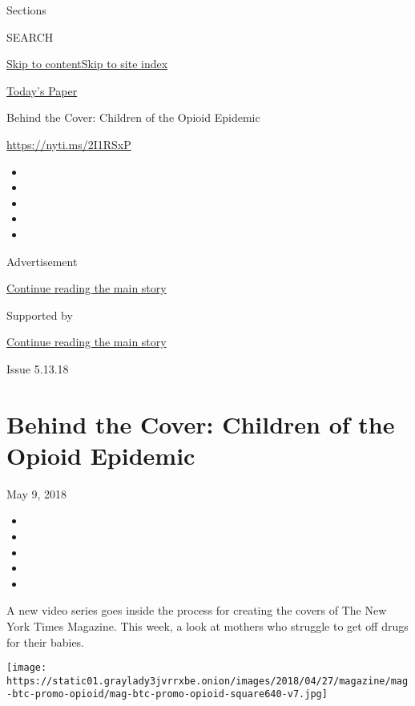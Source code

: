Sections

SEARCH

\protect\hyperlink{site-content}{Skip to
content}\protect\hyperlink{site-index}{Skip to site index}

\href{https://myaccount.nytimes3xbfgragh.onion/auth/login?response_type=cookie\&client_id=vi}{}

\href{https://www.nytimes3xbfgragh.onion/section/todayspaper}{Today's
Paper}

Behind the Cover: Children of the Opioid Epidemic

\url{https://nyti.ms/2I1RSxP}

\begin{itemize}
\item
\item
\item
\item
\item
\end{itemize}

Advertisement

\protect\hyperlink{after-top}{Continue reading the main story}

Supported by

\protect\hyperlink{after-sponsor}{Continue reading the main story}

Issue 5.13.18

\hypertarget{behind-the-cover-children-of-the-opioid-epidemic}{%
\section{Behind the Cover: Children of the Opioid
Epidemic}\label{behind-the-cover-children-of-the-opioid-epidemic}}

May 9, 2018

\begin{itemize}
\item
\item
\item
\item
\item
\end{itemize}

A new video series goes inside the process for creating the covers of
The New York Times Magazine. This week, a look at mothers who struggle
to get off drugs for their babies.

\texttt{[image: https://static01.graylady3jvrrxbe.onion/images/2018/04/27/magazine/mag-btc-promo-opioid/mag-btc-promo-opioid-square640-v7.jpg]}

